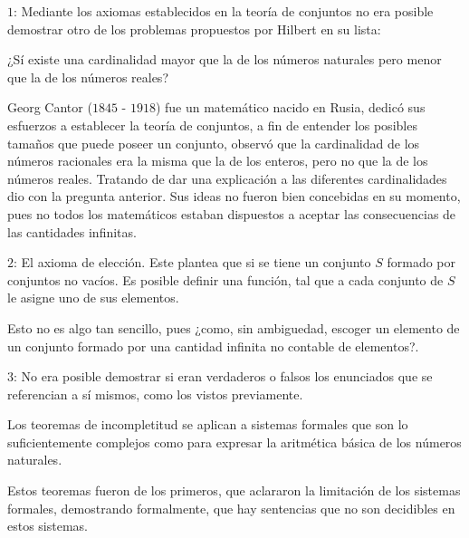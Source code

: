 \documentclass[14pt]{extarticle}
\begin{document}
$1$: Mediante los axiomas establecidos en la teoría de conjuntos no era posible demostrar otro de los problemas propuestos por Hilbert en su lista: 

¿Sí existe una cardinalidad mayor que la de los números naturales pero menor que la de los números reales?
    
Georg Cantor ($1845$ - $1918$) fue un matemático nacido en Rusia, dedicó sus esfuerzos a establecer la teoría de conjuntos, a fin de entender los posibles tamaños que puede poseer un conjunto, observó que la cardinalidad de los números racionales era la misma que la de los enteros, pero no que la de los números reales. Tratando de dar una explicación a las diferentes cardinalidades dio con la pregunta anterior. Sus ideas no fueron bien concebidas en su momento, pues no todos los matemáticos estaban dispuestos a aceptar las consecuencias de las cantidades infinitas. \cite{cantor}

$2$: El axioma de elección. Este plantea que si se tiene un conjunto $S$ formado por conjuntos no vacíos. Es posible definir una función, tal que a cada conjunto de $S$ le asigne uno de sus elementos. \cite{choice}

Esto no es algo tan sencillo, pues ¿como, sin ambiguedad, escoger un elemento de un conjunto formado por una cantidad infinita no contable de elementos?.

$3$: No era posible demostrar si eran verdaderos o falsos los enunciados que se referencian a sí mismos, como los vistos previamente.

Los teoremas de incompletitud se aplican a sistemas formales que son lo suficientemente complejos como para expresar la aritmética básica de los números naturales. 

Estos teoremas fueron de los primeros, que aclararon la limitación de los sistemas formales, demostrando formalmente, que hay sentencias que no son decidibles en estos sistemas.



\end{document}
